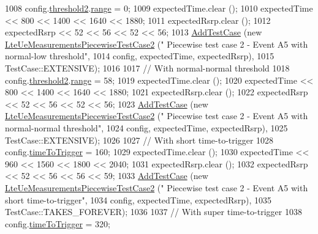 \begin{DoxyCode}
1008   config.\hyperlink{structns3_1_1LteRrcSap_1_1ReportConfigEutra_a4c76552279ea09626d15b48b341bfbd1}{threshold2}.\hyperlink{structns3_1_1LteRrcSap_1_1ThresholdEutra_abd4950e20a1a93727535e8364bf85b03}{range} = 0;
1009   expectedTime.clear ();
1010   expectedTime << 800 << 1400 << 1640 << 1880;
1011   expectedRsrp.clear ();
1012   expectedRsrp << 52 << 56 << 52 << 56;
1013   \hyperlink{classns3_1_1TestCase_a3718088e3eefd5d6454569d2e0ddd835}{AddTestCase} (\textcolor{keyword}{new} \hyperlink{classLteUeMeasurementsPiecewiseTestCase2}{LteUeMeasurementsPiecewiseTestCase2} (\textcolor{stringliteral}{"
      Piecewise test case 2 - Event A5 with normal-low threshold"},
1014                                                         config, expectedTime, expectedRsrp),
1015                TestCase::EXTENSIVE);
1016 
1017   \textcolor{comment}{// With normal-normal threshold}
1018   config.\hyperlink{structns3_1_1LteRrcSap_1_1ReportConfigEutra_a4c76552279ea09626d15b48b341bfbd1}{threshold2}.\hyperlink{structns3_1_1LteRrcSap_1_1ThresholdEutra_abd4950e20a1a93727535e8364bf85b03}{range} = 58;
1019   expectedTime.clear ();
1020   expectedTime << 800 << 1400 << 1640 << 1880;
1021   expectedRsrp.clear ();
1022   expectedRsrp << 52 << 56 << 52 << 56;
1023   \hyperlink{classns3_1_1TestCase_a3718088e3eefd5d6454569d2e0ddd835}{AddTestCase} (\textcolor{keyword}{new} \hyperlink{classLteUeMeasurementsPiecewiseTestCase2}{LteUeMeasurementsPiecewiseTestCase2} (\textcolor{stringliteral}{"
      Piecewise test case 2 - Event A5 with normal-normal threshold"},
1024                                                         config, expectedTime, expectedRsrp),
1025                TestCase::EXTENSIVE);
1026 
1027   \textcolor{comment}{// With short time-to-trigger}
1028   config.\hyperlink{structns3_1_1LteRrcSap_1_1ReportConfigEutra_aee64b76b166b1beda5bbe1760363ed24}{timeToTrigger} = 160;
1029   expectedTime.clear ();
1030   expectedTime << 960 << 1560 << 1800 << 2040;
1031   expectedRsrp.clear ();
1032   expectedRsrp << 52 << 56 << 56 << 59;
1033   \hyperlink{classns3_1_1TestCase_a3718088e3eefd5d6454569d2e0ddd835}{AddTestCase} (\textcolor{keyword}{new} \hyperlink{classLteUeMeasurementsPiecewiseTestCase2}{LteUeMeasurementsPiecewiseTestCase2} (\textcolor{stringliteral}{"
      Piecewise test case 2 - Event A5 with short time-to-trigger"},
1034                                                         config, expectedTime, expectedRsrp),
1035                TestCase::TAKES\_FOREVER);
1036 
1037   \textcolor{comment}{// With super time-to-trigger}
1038   config.\hyperlink{structns3_1_1LteRrcSap_1_1ReportConfigEutra_aee64b76b166b1beda5bbe1760363ed24}{timeToTrigger} = 320;

\end{DoxyCode}
